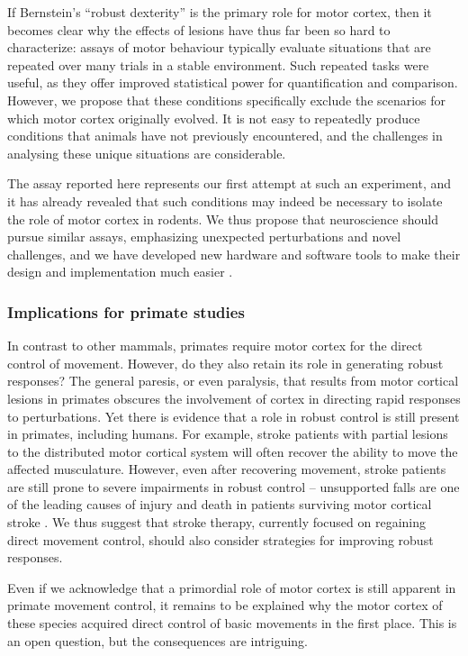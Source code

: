 If Bernstein’s ``robust dexterity'' is the primary role for motor cortex, then it becomes clear why the effects of lesions have thus far been so hard to characterize: assays of motor behaviour typically evaluate situations that are repeated over many trials in a stable environment. Such repeated tasks were useful, as they offer improved statistical power for quantification and comparison. However, we propose that these conditions specifically exclude the scenarios for which motor cortex originally evolved. It is not easy to repeatedly produce conditions that animals have not previously encountered, and the challenges in analysing these unique situations are considerable.

The assay reported here represents our first attempt at such an experiment, and it has already revealed that such conditions may indeed be necessary to isolate the role of motor cortex in rodents. We thus propose that neuroscience should pursue similar assays, emphasizing unexpected perturbations and novel challenges, and we have developed new hardware and software tools to make their design and implementation much easier \cite{Lopes2015a}.

\subsubsection*{Implications for primate studies}

In contrast to other mammals, primates require motor cortex for the direct control of movement. However, do they also retain its role in generating robust responses? The general paresis, or even paralysis, that results from motor cortical lesions in primates obscures the involvement of cortex in directing rapid responses to perturbations. Yet there is evidence that a role in robust control is still present in primates, including humans. For example, stroke patients with partial lesions to the distributed motor cortical system will often recover the ability to move the affected musculature. However, even after recovering movement, stroke patients are still prone to severe impairments in robust control -- unsupported falls are one of the leading causes of injury and death in patients surviving motor cortical stroke \cite{Jacobs2014}. We thus suggest that stroke therapy, currently focused on regaining direct movement control, should also consider strategies for improving robust responses.

Even if we acknowledge that a primordial role of motor cortex is still apparent in primate movement control, it remains to be explained why the motor cortex of these species acquired direct control of basic movements in the first place. This is an open question, but the consequences are intriguing.

